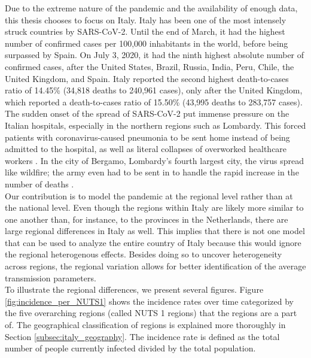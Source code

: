 \documentclass[12pt]{article}
\begin{document}
	Due to the extreme nature of the pandemic and the availability of enough data, this thesis chooses to focus on Italy. Italy has been one of the most intensely struck countries by SARS-CoV-2. Until the end of March, it had the highest number of confirmed cases per 100,000 inhabitants in the world, before being surpassed by Spain. On July 3, 2020, it had the ninth highest absolute number of confirmed cases, after the United States, Brazil, Russia, India, Peru, Chile, the United Kingdom, and Spain. Italy reported the second highest death-to-cases ratio of 14.45\% (34,818 deaths to 240,961 cases), only after the United Kingdom, which reported a death-to-cases ratio of 15.50\% (43,995 deaths to 283,757 cases). The sudden onset of the spread of SARS-CoV-2 put immense pressure on the Italian hospitals, especially in the northern regions such as Lombardy. This forced patients with coronavirus-caused pneumonia to be sent home instead of being admitted to the hospital, as well as literal collapses of overworked healthcare workers \parencite{horowitz2020healthcare}. In the city of Bergamo, Lombardy's fourth largest city, the virus spread like wildfire; the army even had to be sent in to handle the rapid increase in the number of deaths \parencite{scarr2020bergamo}. \\
	
    Our contribution is to model the pandemic at the regional level rather than at the national level. Even though the regions within Italy are likely more similar to one another than, for instance, to the provinces in the Netherlands, there are large regional differences in Italy as well. This implies that there is not one model that can be used to analyze the entire country of Italy because this would ignore the regional heterogenous effects. Besides doing so to uncover heterogeneity across regions, the regional variation allows for better identification of the average transmission parameters. \\
	
	To illustrate the regional differences, we present several figures. Figure \ref{fig:incidence_per_NUTS1} shows the incidence rates over time categorized by the five overarching regions (called NUTS 1 regions) that the regions are a part of. The geographical classification of regions is explained more thoroughly in Section \ref{subsec:italy_geography}. The incidence rate is defined as the total number of people currently infected divided by the total population.
	
\end{document}

